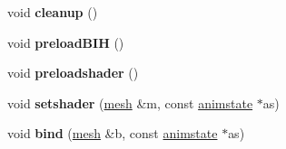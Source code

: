 \begin{DoxyCompactItemize}
void {\bfseries cleanup} ()
\item 
\mbox{\label{structanimmodel_1_1skin_a072872d83bc40192933bd67b45f79198}} 
void {\bfseries preload\+B\+IH} ()
\item 
\mbox{\label{structanimmodel_1_1skin_a37bfff9aea90d0c9d8eb0761e84d76fc}} 
void {\bfseries preloadshader} ()
\item 
\mbox{\label{structanimmodel_1_1skin_a3194e5d9f4eecb251e9ee36f70e5746c}} 
void {\bfseries setshader} (\hyperlink{structanimmodel_1_1mesh}{mesh} \&m, const \hyperlink{structanimmodel_1_1animstate}{animstate} $\ast$as)
\item 
\mbox{\label{structanimmodel_1_1skin_a09dfb79cdfd45a6b335274b14ec81d9d}} 
void {\bfseries bind} (\hyperlink{structanimmodel_1_1mesh}{mesh} \&b, const \hyperlink{structanimmodel_1_1animstate}{animstate} $\ast$as)
\end{DoxyCompactItemize}
